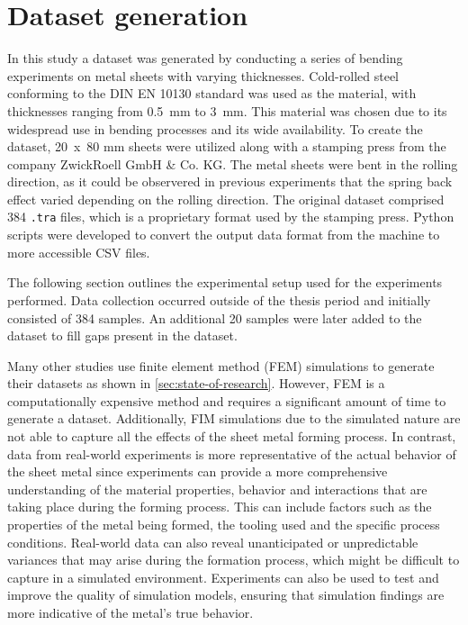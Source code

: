 \section{Dataset generation}\label{sec:dataset-generation}
In this study a dataset was generated by conducting a series of bending experiments on metal sheets with varying
thicknesses.
Cold-rolled steel conforming to the DIN EN 10130 standard was used as the material, with thicknesses ranging from
0.5~mm to 3~mm.
This material was chosen due to its widespread use in bending processes and its wide availability.
To create the dataset, 20~x~80 mm sheets were utilized along with a stamping press from the company ZwickRoell GmbH
\& Co. KG.
The metal sheets were bent in the rolling direction, as it could be observered in previous experiments that the spring
back effect varied depending on the rolling direction.
The original dataset comprised 384 \texttt{.tra} files, which is a proprietary format used by the stamping press.
Python scripts were developed to convert the output data format from the machine to more accessible CSV files.

The following section outlines the experimental setup used for the experiments performed.
Data collection occurred outside of the thesis period and initially consisted of 384 samples.
An additional 20 samples were later added to the dataset to fill gaps present in the dataset.

Many other studies use finite element method (FEM) simulations to generate their datasets as shown in
\cref{sec:state-of-research}.
However, FEM is a computationally expensive method and requires a significant amount of time to
generate a dataset.
Additionally, FIM simulations due to the simulated nature are not able to capture all the effects of the sheet metal
forming process.
In contrast, data from real-world experiments is more representative of the actual behavior of the sheet metal since
experiments can provide a more comprehensive understanding of the material properties, behavior and interactions
that are taking place during the forming process.
This can include factors such as the properties of the metal being formed, the tooling used and the specific process
conditions.
Real-world data can also reveal unanticipated or unpredictable variances that may arise during the formation process,
which might be difficult to capture in a simulated environment.
Experiments can also be used to test and improve the quality of simulation models, ensuring that simulation findings
are more indicative of the metal's true behavior.

